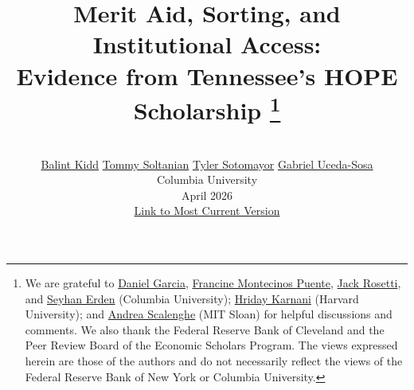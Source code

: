 
\title{\huge\bfseries Merit Aid, Sorting, and Institutional Access:%
  \\[0.3em] Evidence from Tennessee's HOPE Scholarship%
  \thanks{We are grateful to
  \href{mailto:dg3342@columbia.edu}{Daniel Garcia},
  \href{mailto:fam2175@columbia.edu}{Francine Montecinos Puente}, \href{mailto:jackrosetti@gmail.com}{Jack Rosetti}, and
  \href{https://sites.google.com/view/seyhan-erden/home}{Seyhan Erden}
  (Columbia University);
  \href{https://www.hridaykarnani.com/}{Hriday Karnani}
  (Harvard University); and
  \href{mailto:as7596@columbia.edu}{Andrea Scalenghe}
  (MIT Sloan)
  for helpful discussions and comments. We also thank the Federal Reserve
  Bank of Cleveland and the Peer Review Board of the Economic Scholars
  Program. The views expressed herein are those of the authors and do not
  necessarily reflect the views of the Federal Reserve Bank of New York
  or Columbia University.}}

\author{%
  \vspace{-1.2em}\\
  {\Large
  \href{mailto:bok2106@columbia.edu}{Balint Kidd} \quad
  \href{mailto:trs2169@columbia.edu}{Tommy Soltanian} \quad
  \href{mailto:tyler.sotomayor@columbia.edu}{Tyler Sotomayor} \quad
  \href{mailto:gu2145@columbia.edu}{Gabriel Uceda-Sosa}} \\[1.5em]
  {\Large Columbia University} \\[1.5em]
  {\normalsize April 2026} \\[1.5em]
  {\small\color{blue}\href{https://raw.githubusercontent.com/tylersotomayor/merit-aid-working-paper/main/main.pdf}{Link to Most Current Version}}
}

\date{\vspace{-3em}}



\workingpaperheader

\begingroup
\onehalfspacing
\maketitle

\vspace{1em}

